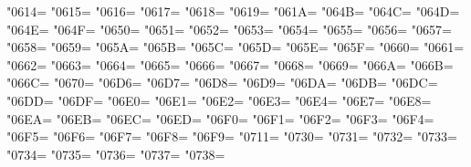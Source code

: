 \XeTeXcharclass"0614=\KclassNum
\XeTeXcharclass"0615=\KclassNum
\XeTeXcharclass"0616=\KclassNum
\XeTeXcharclass"0617=\KclassNum
\XeTeXcharclass"0618=\KclassNum
\XeTeXcharclass"0619=\KclassNum
\XeTeXcharclass"061A=\KclassNum
\XeTeXcharclass"064B=\KclassNum
\XeTeXcharclass"064C=\KclassNum
\XeTeXcharclass"064D=\KclassNum
\XeTeXcharclass"064E=\KclassNum
\XeTeXcharclass"064F=\KclassNum
\XeTeXcharclass"0650=\KclassNum
\XeTeXcharclass"0651=\KclassNum
\XeTeXcharclass"0652=\KclassNum
\XeTeXcharclass"0653=\KclassNum
\XeTeXcharclass"0654=\KclassNum
\XeTeXcharclass"0655=\KclassNum
\XeTeXcharclass"0656=\KclassNum
\XeTeXcharclass"0657=\KclassNum
\XeTeXcharclass"0658=\KclassNum
\XeTeXcharclass"0659=\KclassNum
\XeTeXcharclass"065A=\KclassNum
\XeTeXcharclass"065B=\KclassNum
\XeTeXcharclass"065C=\KclassNum
\XeTeXcharclass"065D=\KclassNum
\XeTeXcharclass"065E=\KclassNum
\XeTeXcharclass"065F=\KclassNum
\XeTeXcharclass"0660=\KclassNum
\XeTeXcharclass"0661=\KclassNum
\XeTeXcharclass"0662=\KclassNum
\XeTeXcharclass"0663=\KclassNum
\XeTeXcharclass"0664=\KclassNum
\XeTeXcharclass"0665=\KclassNum
\XeTeXcharclass"0666=\KclassNum
\XeTeXcharclass"0667=\KclassNum
\XeTeXcharclass"0668=\KclassNum
\XeTeXcharclass"0669=\KclassNum
\XeTeXcharclass"066A=\KclassNum
\XeTeXcharclass"066B=\KclassNum
\XeTeXcharclass"066C=\KclassNum
\XeTeXcharclass"0670=\KclassNum
\XeTeXcharclass"06D6=\KclassNum
\XeTeXcharclass"06D7=\KclassNum
\XeTeXcharclass"06D8=\KclassNum
\XeTeXcharclass"06D9=\KclassNum
\XeTeXcharclass"06DA=\KclassNum
\XeTeXcharclass"06DB=\KclassNum
\XeTeXcharclass"06DC=\KclassNum
\XeTeXcharclass"06DD=\KclassNum
\XeTeXcharclass"06DF=\KclassNum
\XeTeXcharclass"06E0=\KclassNum
\XeTeXcharclass"06E1=\KclassNum
\XeTeXcharclass"06E2=\KclassNum
\XeTeXcharclass"06E3=\KclassNum
\XeTeXcharclass"06E4=\KclassNum
\XeTeXcharclass"06E7=\KclassNum
\XeTeXcharclass"06E8=\KclassNum
\XeTeXcharclass"06EA=\KclassNum
\XeTeXcharclass"06EB=\KclassNum
\XeTeXcharclass"06EC=\KclassNum
\XeTeXcharclass"06ED=\KclassNum
\XeTeXcharclass"06F0=\KclassNum
\XeTeXcharclass"06F1=\KclassNum
\XeTeXcharclass"06F2=\KclassNum
\XeTeXcharclass"06F3=\KclassNum
\XeTeXcharclass"06F4=\KclassNum
\XeTeXcharclass"06F5=\KclassNum
\XeTeXcharclass"06F6=\KclassNum
\XeTeXcharclass"06F7=\KclassNum
\XeTeXcharclass"06F8=\KclassNum
\XeTeXcharclass"06F9=\KclassNum
\XeTeXcharclass"0711=\KclassNum
\XeTeXcharclass"0730=\KclassNum
\XeTeXcharclass"0731=\KclassNum
\XeTeXcharclass"0732=\KclassNum
\XeTeXcharclass"0733=\KclassNum
\XeTeXcharclass"0734=\KclassNum
\XeTeXcharclass"0735=\KclassNum
\XeTeXcharclass"0736=\KclassNum
\XeTeXcharclass"0737=\KclassNum
\XeTeXcharclass"0738=\KclassNum
